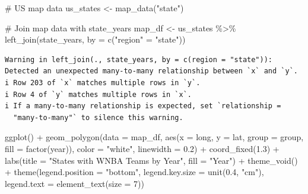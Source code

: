 \documentclass[
  letterpaper,
  DIV=11,
  numbers=noendperiod]{scrartcl}
\newenvironment{Shaded}{\begin{snugshade}}{\end{snugshade}}
\newcommand{\AttributeTok}[1]{\textcolor[rgb]{0.40,0.45,0.13}{#1}}
\newcommand{\CommentTok}[1]{\textcolor[rgb]{0.37,0.37,0.37}{#1}}
\newcommand{\DecValTok}[1]{\textcolor[rgb]{0.68,0.00,0.00}{#1}}
\newcommand{\FloatTok}[1]{\textcolor[rgb]{0.68,0.00,0.00}{#1}}
\newcommand{\FunctionTok}[1]{\textcolor[rgb]{0.28,0.35,0.67}{#1}}
\newcommand{\NormalTok}[1]{\textcolor[rgb]{0.00,0.23,0.31}{#1}}
\newcommand{\OtherTok}[1]{\textcolor[rgb]{0.00,0.23,0.31}{#1}}
\newcommand{\SpecialCharTok}[1]{\textcolor[rgb]{0.37,0.37,0.37}{#1}}
\newcommand{\StringTok}[1]{\textcolor[rgb]{0.13,0.47,0.30}{#1}}
\begin{document}
\begin{Shaded}
\begin{Highlighting}[]
\CommentTok{\# US map data}
\NormalTok{us\_states }\OtherTok{\textless{}{-}} \FunctionTok{map\_data}\NormalTok{(}\StringTok{"state"}\NormalTok{)}

\CommentTok{\# Join map data with state\_years}
\NormalTok{map\_df }\OtherTok{\textless{}{-}}\NormalTok{ us\_states }\SpecialCharTok{\%\textgreater{}\%}
  \FunctionTok{left\_join}\NormalTok{(state\_years, }\AttributeTok{by =} \FunctionTok{c}\NormalTok{(}\StringTok{"region"} \OtherTok{=} \StringTok{"state"}\NormalTok{))}
\end{Highlighting}
\end{Shaded}

\begin{verbatim}
Warning in left_join(., state_years, by = c(region = "state")): Detected an unexpected many-to-many relationship between `x` and `y`.
i Row 203 of `x` matches multiple rows in `y`.
i Row 4 of `y` matches multiple rows in `x`.
i If a many-to-many relationship is expected, set `relationship =
  "many-to-many"` to silence this warning.
\end{verbatim}

\begin{Shaded}
\begin{Highlighting}[]
\FunctionTok{ggplot}\NormalTok{() }\SpecialCharTok{+}
  \FunctionTok{geom\_polygon}\NormalTok{(}\AttributeTok{data =}\NormalTok{ map\_df,}
               \FunctionTok{aes}\NormalTok{(}\AttributeTok{x =}\NormalTok{ long, }\AttributeTok{y =}\NormalTok{ lat, }\AttributeTok{group =}\NormalTok{ group, }\AttributeTok{fill =} \FunctionTok{factor}\NormalTok{(year)),}
               \AttributeTok{color =} \StringTok{"white"}\NormalTok{, }\AttributeTok{linewidth =} \FloatTok{0.2}\NormalTok{) }\SpecialCharTok{+}
  \FunctionTok{coord\_fixed}\NormalTok{(}\FloatTok{1.3}\NormalTok{) }\SpecialCharTok{+}
  \FunctionTok{labs}\NormalTok{(}\AttributeTok{title =} \StringTok{"States with WNBA Teams by Year"}\NormalTok{, }\AttributeTok{fill =} \StringTok{"Year"}\NormalTok{) }\SpecialCharTok{+}
  \FunctionTok{theme\_void}\NormalTok{() }\SpecialCharTok{+}
  \FunctionTok{theme}\NormalTok{(}\AttributeTok{legend.position =} \StringTok{"bottom"}\NormalTok{,}
        \AttributeTok{legend.key.size =} \FunctionTok{unit}\NormalTok{(}\FloatTok{0.4}\NormalTok{, }\StringTok{"cm"}\NormalTok{),}
        \AttributeTok{legend.text =} \FunctionTok{element\_text}\NormalTok{(}\AttributeTok{size =} \DecValTok{7}\NormalTok{))}
\end{Highlighting}
\end{Shaded}
\end{document}
